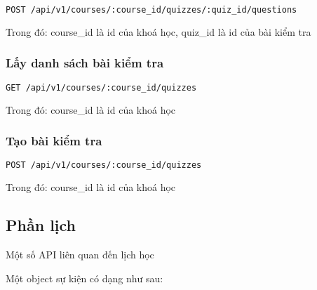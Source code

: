 \documentclass[../Thesis.tex]{subfiles}
\begin{document}
          \begin{lstlisting}[language=bash]
            POST /api/v1/courses/:course_id/quizzes/:quiz_id/questions
          \end{lstlisting}

          Trong đó: course\_id là id của khoá học, quiz\_id là id của bài kiểm tra

        \subsubsection{Lấy danh sách bài kiểm tra}
          \begin{lstlisting}[language=bash]
            GET /api/v1/courses/:course_id/quizzes
          \end{lstlisting}

          Trong đó: course\_id là id của khoá học

        \subsubsection{Tạo bài kiểm tra}

          \begin{lstlisting}[language=bash]
            POST /api/v1/courses/:course_id/quizzes
          \end{lstlisting}

          Trong đó: course\_id là id của khoá học

      \subsection{Phần lịch}
          Một số API liên quan đến lịch học

          Một object sự kiện có dạng như sau:
\end{document}

